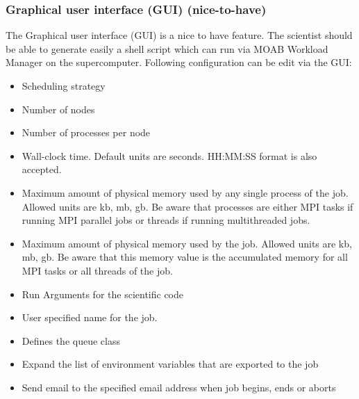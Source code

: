 	\subsubsection{Graphical user interface (GUI) (nice-to-have)}
		The Graphical user interface (GUI) is a nice to have feature. The scientist should be able to generate easily a shell script which can run via MOAB Workload Manager on the supercomputer. Following configuration can be edit via the GUI:
		
		\begin{itemize}
			\item Scheduling strategy
			\item Number of nodes
			\item Number of processes per node
			\item Wall-clock time. Default units are seconds. 
			HH:MM:SS format is also accepted.
			\item Maximum amount of physical memory used by any single process of the job. Allowed units are kb, mb, gb. Be aware that processes are either MPI tasks if running MPI parallel jobs or threads if running multithreaded jobs.
			\item Maximum amount of physical memory used by the job.
			Allowed units are kb, mb, gb. Be aware that this memory value is the accumulated memory for all MPI tasks or all threads of the job.
			\item Run Arguments for the scientific code
			\item User specified name for the job.
			\item Defines the queue class
			\item Expand the list of environment variables that are exported to the job
			\item Send email to the specified email address when job begins, ends or aborts
		\end{itemize}
	
	